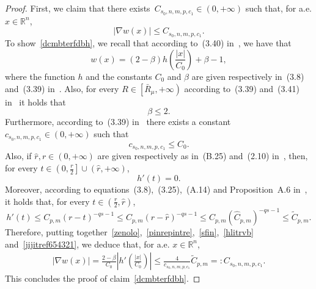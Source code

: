 \documentclass[12pt]{article}
\newcommand{\R}{\mathbb{R}}
\numberwithin{equation}{section}
\renewcommand{\leq}{\leqslant}
\begin{document}
\begin{appendix}
\begin{proof}
First, we claim that there exists~$C_{s_0,n,m,p,c_1}\in (0,+\infty)$ such that, for a.e. $x\in\R^n$,
\begin{equation}\label{dcmbterfdbh}
\left|\nabla w(x)\right|\leq C_{s_0,n,m,p,c_1}. 
\end{equation}
To show~\eqref{dcmbterfdbh}, we recall that according to~(3.40) in~\cite{DFVERPP}, we have that 
\begin{equation}\label{zenolo}
w(x)=(2-\beta)h\left(\frac{\left|x\right|}{C_0}\right)+\beta-1,
\end{equation}
where the function $h$ and the constants $C_0$ and $\beta$ are given respectively in~(3.8) and~(3.39) in~\cite{DFVERPP}. Also, for every $R\in\left[\bar{R}_\mu,+\infty\right)$ according to~(3.39) and~(3.41) in~\cite{DFVERPP} it holds that
\begin{equation}\label{pinrepintre}
\beta\leq 2. 
\end{equation} 
Furthermore, according to~(3.39) in~\cite{DFVERPP} there exists a constant $c_{s_0,n,m,p,c_1}\in (0,+\infty)$  such that 
\begin{equation}\label{sfin}
c_{s_0,n,m,p,c_1}\leq C_0.
\end{equation}
Also, if $\hat{r},r\in (0,+\infty)$ are given respectively as in~(B.25) and~(2.10) in~\cite{DFVERPP}, then, for every $t\in \left(0,\frac{r}{2}\right]\cup \left(\hat{r},+\infty\right)$,
\begin{equation}\label{hlitrvb}
h'(t)=0. 
\end{equation}
Moreover, according to equations~(3.8),~(3.25),~(A.14) and Proposition~A.6 in~\cite{DFVERPP}, it holds that, for every $t \in  \left(\frac{r}{2},\hat{r}\right)$,
\begin{equation}\label{jijitref654321}
h'(t)\leq C_{p,m} (r-t)^{-qs-1}\leq C_{p,m} (r-\hat{r})^{-qs-1}\leq C_{p,m}\left(\widehat{C}_{p,m}\right)^{-qs-1}\leq \tilde{C}_{p,m}. 
\end{equation}
Therefore, putting together~\eqref{zenolo},~\eqref{pinrepintre},~\eqref{sfin},~\eqref{hlitrvb} and~\eqref{jijitref654321}, we deduce that, for a.e. $x\in\R^n$,
\begin{equation*}
\begin{split}
\left|\nabla w(x)\right|=\frac{2-\beta}{C_0}\left|h'\left(\frac{\left|x\right|}{C_0}\right)\right| \leq \frac{4}{c_{s_0,n,m,p,c_1}} \tilde{C}_{p,m}=:C_{s_0,n,m,p,c_1}. 
\end{split}
\end{equation*}  
This concludes the proof of claim~\eqref{dcmbterfdbh}. 


\end{proof}
\end{appendix}
\end{document}
